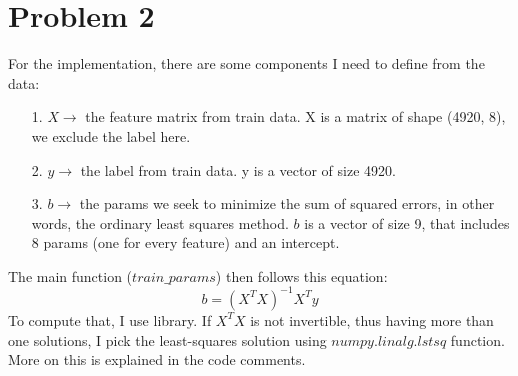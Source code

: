 \documentclass[twoside]{homework}
\begin{document}
\section*{Problem 2}
For the implementation, there are some components I need to define from the data:
\begin{itemize}
    \item [1.] $X\xrightarrow{}$ the feature matrix from train data. X is a matrix of shape (4920, 8), we exclude the label here.
    \item [2.] $y\xrightarrow{}$ the label from train data. y is a vector of size 4920.
    \item [3.] $b\xrightarrow{}$ the params we seek to minimize the sum of squared errors, in other words, the ordinary least squares method. $b$ is a vector of size 9, that includes 8 params (one for every feature) and an intercept.
\end{itemize}
The main function ($train\_params$) then follows this equation:
$$b = (X^TX)^{-1}X^Ty$$
To compute that, I use  library. If $X^TX$ is not invertible, thus having more than one solutions, I pick the least-squares solution using $numpy.linalg.lstsq$ function. More on this is explained in the code comments.
\end{document}
